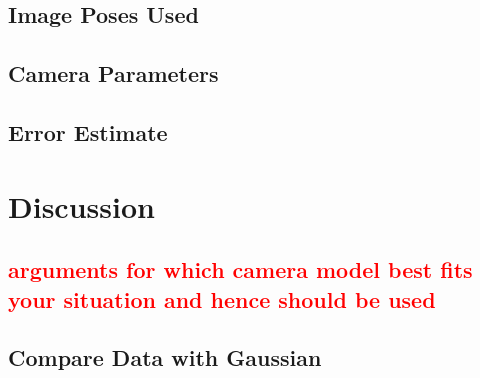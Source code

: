 \documentclass[10pt,a4paper]{article}
\begin{document}
		\subsection{Image Poses Used}
		\subsection{Camera Parameters}
		\subsection{Error Estimate}
	\section{Discussion}
		\subsection{\textcolor{red}{arguments for which camera model best fits your situation and hence should be used}}
		\subsection{Compare Data with Gaussian}			
\end{document}
